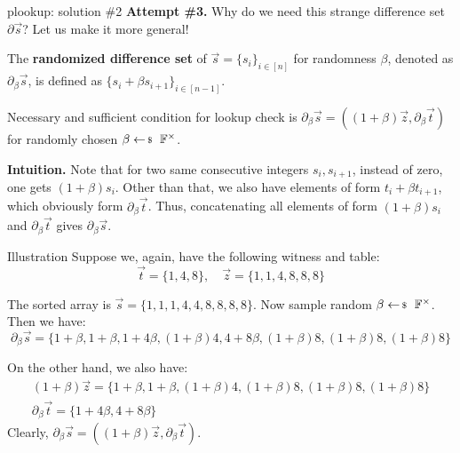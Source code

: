 \documentclass{zkdl-presentation-template}
\begin{document}
    \begin{frame}{plookup: solution \#2}
        \textbf{Attempt \#3.} Why do we need this strange difference set $\partial\vec{s}$? Let us 
        make it more general!\pause
        \begin{definition}
            The \textbf{randomized difference set} of $\vec{s}=\{s_i\}_{i \in
            [n]}$ for randomness $\beta$, denoted as $\partial_{\beta}\vec{s}$,
            is defined as $\{s_i+\beta s_{i+1}\}_{i \in [n-1]}$.\pause
        \end{definition} 

        \begin{proposition}
            Necessary and sufficient condition for lookup check is
            $\partial_{\beta}\vec{s} = ((1+\beta)\vec{z},
            \partial_{\beta}\vec{t})$ for randomly chosen $\beta \leftarrowS
            \mathbb{F}^{\times}$.\pause
        \end{proposition}

        \textbf{Intuition.} Note that for two same consecutive integers
        $s_i,s_{i+1}$, instead of zero, one gets $(1+\beta)s_i$. Other than
        that, we also have elements of form $t_i+\beta t_{i+1}$, which obviously
        form $\partial_{\beta}\vec{t}$. Thus, concatenating all elements of form
        $(1+\beta)s_i$ and $\partial_{\beta}\vec{t}$ gives
        $\partial_{\beta}\vec{s}$.
    \end{frame}

    \begin{frame}{Illustration}
        Suppose we, again, have the following witness and table:
        \begin{equation*}
            \vec{t} = \{1,4,8\}, \quad \vec{z} = \{1,1,4,8,8,8\}
        \end{equation*}

        \pause The sorted array is $\vec{s} = \{1,1,1,4,4,8,8,8,8\}$. Now sample 
        random $\beta \leftarrowS \mathbb{F}^{\times}$. Then we have:
        \begin{equation*}
            \partial_{\beta}\vec{s} = \{1+\beta,1+\beta,1+4\beta,(1+\beta)4,4+8\beta,(1+\beta)8,(1+\beta)8,(1+\beta)8\}
        \end{equation*}

        \pause On the other hand, we also have:
        \begin{gather*}
            (1+\beta)\vec{z} = \{1+\beta,1+\beta,(1+\beta)4,(1+\beta)8,(1+\beta)8,(1+\beta)8\} \\
            \partial_{\beta}\vec{t} = \{1+4\beta, 4+8\beta\}
        \end{gather*}
        \pause Clearly,
        $\partial_{\beta}\vec{s}=((1+\beta)\vec{z},\partial_{\beta}\vec{t})$.
    \end{frame}
\end{document}
